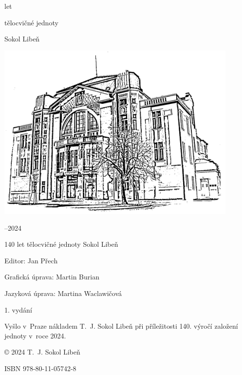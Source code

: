 \documentclass[a5paper, 11pt, twoside]{article}
\newcommand{\titlesize}{\fontsize{36pt}{54pt}}
\begin{document}
\begin{center}
  \setlength{\parskip}{6pt}
  \vspace*{18pt}
  {\fontsize{56pt}{66pt} let}

  {\titlesize\tyrs tělocvičné jednoty}
  
  {\titlesize\tyrs Sokol Libeň}

  \vspace*{\fill}

    \includegraphics*[width=0.9\textwidth]{./Sokolovna-kresba-black.png}

  \vspace*{\fill}

  {\titlesize{}–2024}
  \vspace*{-1cm}
\end{center}

\mbox{}
\clearpage




\vspace*{\fill}
{ \parindent0pt \parskip3pt
140 let tělocvičné jednoty Sokol Libeň

Editor: Jan Přech 

Grafická úprava: Martin Burian 

Jazyková úprava: Martina Waclawičová

1. vydání 

Vyšlo v~Praze nákladem T.~J. Sokol Libeň při příležitosti 140. výročí založení jednoty v~roce 2024.

© 2024 T.~J. Sokol Libeň

ISBN 978-80-11-05742-8
}
\clearpage

\end{document}
